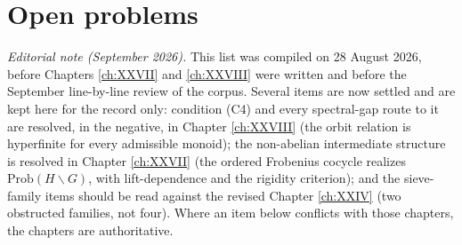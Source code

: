 \chapter{Open problems}\label{ch:open}

\noindent\emph{Editorial note (September 2026).} This list was compiled on 28 August 2026,
before Chapters \ref{ch:XXVII} and \ref{ch:XXVIII} were written and before the September
line-by-line review of the corpus. Several items are now settled and are kept here for the
record only: condition (C4) and every spectral-gap route to it are resolved, in the
negative, in Chapter \ref{ch:XXVIII} (the orbit relation is hyperfinite for every
admissible monoid); the non-abelian intermediate structure is resolved in Chapter
\ref{ch:XXVII} (the ordered Frobenius cocycle realizes $\mathrm{Prob}(H\backslash G)$, with
lift-dependence and the rigidity criterion); and the sieve-family items should be read
against the revised Chapter \ref{ch:XXIV} (two obstructed families, not four). Where an
item below conflicts with those chapters, the chapters are authoritative.\medskip

